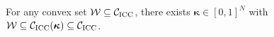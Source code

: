 \documentclass[nonblindrev]{informs2017}
\newcommand{\bmh}[1]{\hat{\bm{#1}}}
\newcommand{\1}[1]{\mathds{1}{\left(#1\right)}}
\begin{document}
\begin{proposition}\label{prop:dominant convex approximation_1}
	For any convex set $\mathcal{W} \subseteq \mathcal{C}_{\rm ICC}$, there exists $\bm{\kappa} \in[0,1]^N$ with $\mathcal{W} \subseteq \mathcal{C}_{\rm ICC} (\bm{\kappa}) \subseteq \mathcal{C}_{\rm ICC}$.
\end{proposition}



\end{document}
